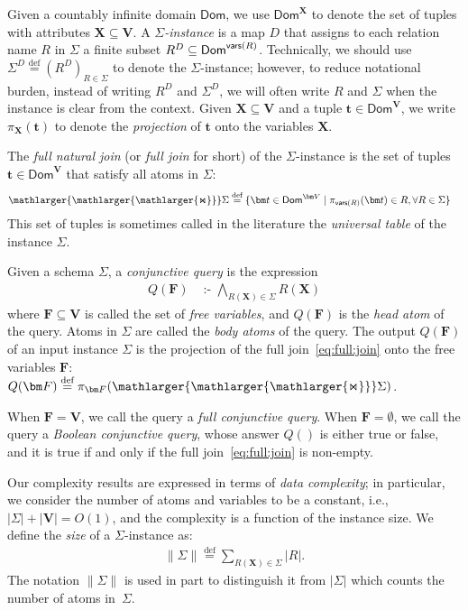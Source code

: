 \documentclass[10pt,a4paper]{article}
\newcommand{\norm}[1]{\|#1\|}
\newcommand{\setof}[2]{\{{#1}\mid{#2}\}}        %
\newcommand{\dom}{\textsf{Dom}}
\newcommand{\defeq}{\stackrel{\text{def}}{=}}
\newcommand{\cd}{\text{ :- }}
\newcommand{\bigjoin}{\mathlarger{\mathlarger{\mathlarger{\Join}}}}
\newcommand{\vars}{\text{\sf vars}}
\begin{document}
Given a countably infinite domain $\dom$, we use $\dom^{\bm X}$ to denote the set of tuples
with attributes $\bm X \subseteq \bm V$. A {\em $\Sigma$-instance} is a map $D$ that assigns
to each relation name $R$ in $\Sigma$ a finite subset $R^D \subseteq\dom^{\vars(R)}$.
Technically, we should use $\Sigma^D \defeq (R^D)_{R \in \Sigma}$ to denote the
$\Sigma$-instance; however, to reduce notational burden, instead of writing $R^D$ and
$\Sigma^D$, we will often write $R$ and $\Sigma$ when the instance is clear from the context.
Given $\bm X \subseteq \bm V$ and a tuple $\bm t \in \dom^{\bm V}$, we write $\pi_{\bm
X}(\bm t)$ to denote the {\em projection} of $\bm t$ onto the variables $\bm X$.

The {\em full natural join} (or {\em full join} for short) of the $\Sigma$-instance is the set of tuples
$\bm t \in \dom^{\bm V}$ that satisfy all atoms in $\Sigma$:
%
\begin{align}
  \bigjoin \Sigma & \defeq \setof{\bm t \in \dom^{\bm V}}{
    \pi_{\vars(R)}(\bm t) \in R,
    \forall R \in \Sigma
  }
  \label{eq:full:join}
\end{align}
%
This set of tuples is sometimes called in the literature the {\em universal table} of the
instance $\Sigma$.

Given a schema $\Sigma$,  a {\em conjunctive query} is the expression
%
\begin{align}
    Q(\bm F) &\cd  \bigwedge_{R(\bm X)\in \Sigma} R(\bm X) \label{eq:cq}
\end{align}
where $\bm F \subseteq \bm V$ is called the set of {\em free variables},
and $Q(\bm F)$ is the {\em head atom} of the query.
Atoms in $\Sigma$ are called the {\em body atoms} of the query.
The output $Q(\bm F)$ of an input instance $\Sigma$ is the projection of the
full join~\eqref{eq:full:join} onto the free variables $\bm F$:
$Q(\bm F) \defeq \pi_{\bm F}(\bigjoin \Sigma)$.

When $\bm F = \bm V$, we call the query a {\em full conjunctive query}.
When $\bm F = \emptyset$, we call the query a {\em Boolean conjunctive query}, whose answer
$Q()$ is either {\sf true} or {\sf false}, and it is true if and only if the full
join~\eqref{eq:full:join} is non-empty.

Our complexity results are expressed in terms of
{\em data complexity}; in particular, we consider the number of atoms and variables to be a constant, i.e.,~$|\Sigma| + |\bm V| = O(1)$,
and the complexity is a function of the instance size. We
define the {\em size} of a $\Sigma$-instance as:
\begin{align}
    \norm{\Sigma}\defeq \sum_{R(\bm X) \in \Sigma} |R|.
    \label{eqn:input:size}
\end{align}
The notation $\norm{\Sigma}$ is used in part to distinguish it from $|\Sigma|$ which
counts the number of atoms in~$\Sigma$.
\end{document}
